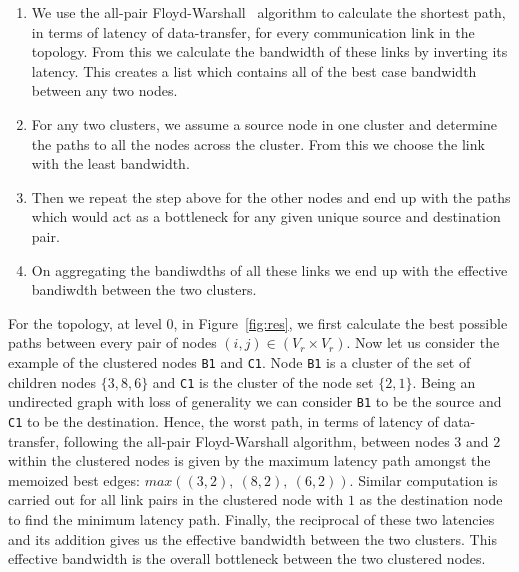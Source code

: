 \begin{itemize}
  \begin{enumerate}

  \item We use the all-pair Floyd-Warshall~\cite{sski08} algorithm to calculate
  the shortest path, in terms of latency of data-transfer, for every
  communication link in the topology. From this we calculate the bandwidth of
  these links by inverting its latency. This creates a list which contains all
  of the best case bandwidth between any two nodes.

  \item For any two clusters, we assume a source node in one cluster and
  determine the paths to all the nodes across the cluster. From this we choose
  the link with the least bandwidth.

  \item Then we repeat the step above for the other nodes and end up with the
  paths which would act as a bottleneck for any given unique source and
  destination pair.

  \item On aggregating the bandiwdths of all these links we end up with the
  effective bandiwdth between the two clusters.

  \end{enumerate}


  For the topology, at level 0, in Figure~\ref{fig:res}, we first
  calculate the best possible paths between every pair of nodes
  \mbox{$(i,j) \in (V_r \times V_r)$}. Now let us consider the example
  of the clustered nodes \texttt{B1} and \texttt{C1}. Node \texttt{B1}
  is a cluster of the set of children nodes $\{3, 8, 6\}$ and
  \texttt{C1} is the cluster of the node set $\{2, 1\}$. Being an
  undirected graph with loss of generality we can consider \texttt{B1}
  to be the source and \texttt{C1} to be the destination. Hence, the
  worst path, in terms of latency of data-transfer, following the
  all-pair Floyd-Warshall algorithm, between nodes $3$ and $2$ within
  the clustered nodes is given by the maximum latency path amongst the
  memoized best edges: $max((3,2),\ (8,2),\ (6,2))$. Similar computation
  is carried out for all link pairs in the clustered node with $1$ as
  the destination node to find the minimum latency path. Finally, the
  reciprocal of these two latencies and its addition gives us the
  effective bandwidth between the two clusters. This effective
  bandwidth is the overall bottleneck between the two clustered nodes.


\end{itemize}

